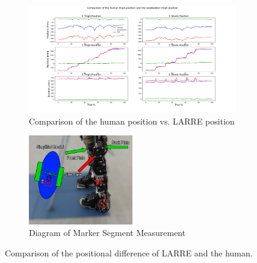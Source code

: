 \begin{figure}[h!]

    \begin{subfigure}{\textwidth}
        \centering
        \captionsetup{justification=centering}
        \centerline{
        \includegraphics[width=\textwidth, frame]{images/mech_design/position_comparison.png}}
        \caption[Comparison of Difference of Human and LARRE Position]{Comparison of the human position vs. LARRE position}
        \label{fig:positioncomparison}
    \end{subfigure}
        \begin{subfigure}{\textwidth}
        \centering
        \captionsetup{justification=centering}
        \centerline{
        \includegraphics[width=0.5\textwidth, frame]{images/mech_design/side_marker_positioning.png}}
        \caption[Diagram of Marker Segment Measurement]{Diagram of Marker Segment Measurement}
        \label{fig:markerpositiondiagram}
    \end{subfigure}
    \caption[Comparison of LARRE and human positions]{Comparison of the positional difference of LARRE and the human.}
    \label{fig:exohumanmarkercompare}
\end{figure}




